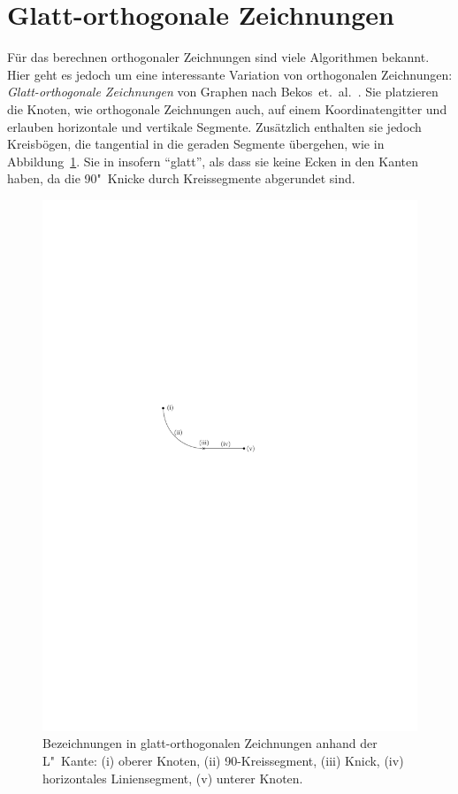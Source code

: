 \documentclass[a4paper]{scrreprt}
\theoremstyle{definition}
\begin{document}

\section{Glatt-orthogonale Zeichnungen}
\label{sec:smooth_definition}

Für das berechnen orthogonaler Zeichnungen sind viele Algorithmen bekannt. Hier geht es jedoch um eine interessante Variation von orthogonalen Zeichnungen: \emph{Glatt-orthogonale Zeichnungen} von Graphen nach Bekos~et.~al.~\cite{bekos-13}. Sie platzieren die Knoten, wie orthogonale Zeichnungen auch, auf einem Koordinatengitter und erlauben horizontale und vertikale Segmente. Zusätzlich enthalten sie jedoch Kreisbögen, die tangential in die geraden Segmente übergehen, wie in Abbildung~\ref{fig:anatomieLKante}. Sie in insofern "`glatt"', als dass sie keine Ecken in den Kanten haben, da die 90\textdegree"~Knicke durch Kreissegmente abgerundet sind.

\begin{figure}[h]
  \centering
  \includegraphics{anatomieLKante}
  \caption{Bezeichnungen in glatt-orthogonalen Zeichnungen anhand der L"~Kante: (i) oberer Knoten, (ii) 90\textdegree-Kreissegment, (iii) Knick, (iv) horizontales Liniensegment, (v) unterer Knoten.}
  \label{fig:anatomieLKante}
\end{figure}
\end{document}
